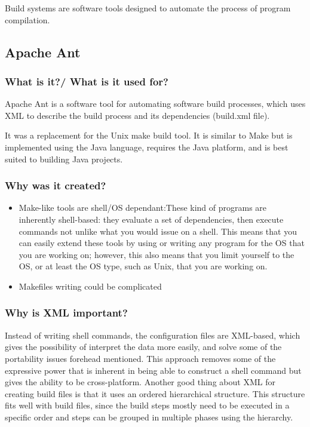 Build systems are software tools designed to automate the process of program compilation. 

\subsection{Apache Ant}
\subsubsection{What is it?/ What is it used for?}

Apache Ant is a software tool for automating software build processes, which uses XML to describe the build process and its dependencies (build.xml file).

It was a replacement for the Unix make build tool. It is similar to Make but is implemented using the Java language, requires the Java platform, and is best suited to building Java projects. 

\subsubsection{Why was it created?}



\begin{itemize}

\item Make-like tools are shell/OS dependant:These kind of programs are inherently shell-based: they evaluate a set of dependencies, then execute commands not unlike what you would issue on a shell. This means that you can easily extend these tools by using or writing any program for the OS that you are working on; however, this also means that you limit yourself to the OS, or at least the OS type, such as Unix, that you are working on.  

\item Makefiles writing could be complicated 

\end{itemize}


\subsubsection{Why is XML important?}

Instead of writing shell commands, the configuration files are XML-based, which gives the possibility of interpret the data more easily, and solve some of the portability issues forehead mentioned. This approach removes some of the expressive power that is inherent in being able to construct a shell command but gives the ability to be cross-platform. Another good thing about XML for creating build files is that it uses an ordered hierarchical structure. This structure fits well with build files, since the build steps mostly need to be executed in a specific order and steps can be grouped in multiple phases using the hierarchy.


